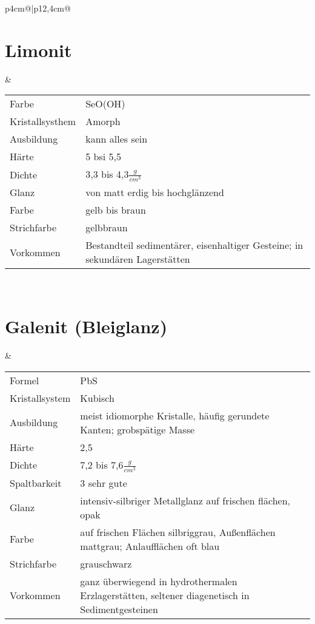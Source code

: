 \documentclass[a4, 12pt]{scrreprt}
\begin{document}
\newpage
\begin{tabular}{p{4cm}@{}|p{}@{}}
\hline 
\section{Limonit} & 
	\begin{tabular}{p{3cm}@{}p{9cm}@{}}
	Farbe & SeO(OH)\\
	Kristallsysthem & Amorph\\
	Ausbildung & kann alles sein\\
	Härte & 5 bsi 5,5\\
	Dichte & 3,3 bis 4,3$\frac{g}{cm^3}$\\
	Glanz & von matt erdig bis hochglänzend\\
	Farbe & gelb bis braun\\
	Strichfarbe & gelbbraun\\
	Vorkommen & Bestandteil sedimentärer, eisenhaltiger Gesteine; in sekundären Lagerstätten\\
	\end{tabular}\\
\hline 

\section{Galenit (Bleiglanz)} & 
	\begin{tabular}{p{3cm}@{}p{9cm}@{}}
	Formel & PbS\\
	Kristallsystem & Kubisch\\
	Ausbildung & meist idiomorphe Kristalle, häufig gerundete Kanten; grobspätige Masse\\
	Härte & 2,5\\
	Dichte & 7,2 bis 7,6$\frac{g}{cm^3}$\\
	Spaltbarkeit & 3 sehr gute\\
	Glanz & intensiv-silbriger Metallglanz auf frischen flächen, opak\\
	Farbe & auf frischen Flächen silbriggrau, Außenflächen mattgrau; Anlaufflächen oft blau\\
	Strichfarbe & grauschwarz\\
	Vorkommen & ganz überwiegend in hydrothermalen Erzlagerstätten, seltener diagenetisch in Sedimentgesteinen\\
	\end{tabular}\\
\hline 


\end{tabular}
\end{document}
